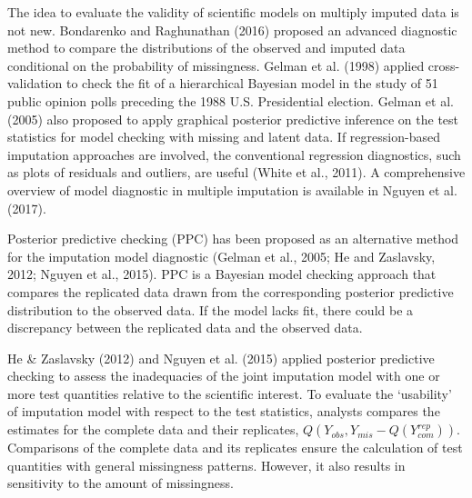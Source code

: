 \documentclass[12pt, fullpage, a4paper]{article}
\begin{document}
The idea to evaluate the validity of scientific models on multiply imputed data is not new. Bondarenko and Raghunathan (2016)\nocite{bondarenko2016graphical} proposed an advanced diagnostic method to compare the distributions of the observed and imputed data conditional on the probability of missingness. Gelman et al. (1998)\nocite{gelman1998not} applied cross-validation to check the fit of a hierarchical Bayesian model in the study of 51 public opinion polls preceding the 1988 U.S. Presidential election. Gelman et al. (2005) also proposed to apply graphical posterior predictive inference on the test statistics for model checking with missing and latent data. If regression-based imputation approaches are involved, the conventional regression diagnostics, such as plots of residuals and outliers, are useful (White et al., 2011)\nocite{white2011multiple}. A comprehensive overview of model diagnostic in multiple imputation is available in Nguyen et al. (2017)\nocite{nguyen2017model}.

Posterior predictive checking (PPC) has been proposed as an alternative method for the imputation model diagnostic (Gelman et al., 2005; He and Zaslavsky, 2012; Nguyen et al., 2015\nocite{nguyen2015posterior}). PPC is a Bayesian model checking approach that compares the replicated data drawn from the corresponding posterior predictive distribution to the observed data. If the model lacks fit, there could be a discrepancy between the replicated data and the observed data. 

He \& Zaslavsky (2012) and Nguyen et al. (2015) applied posterior predictive checking to assess the inadequacies of the joint imputation model with one or more test quantities relative to the scientific interest. To evaluate the `usability' of imputation model with respect to the test statistics, analysts compares the estimates for the complete data and their replicates, $Q(Y_{obs}, Y_{mis} - Q(Y^{rep}_{com}))$. Comparisons of the complete data and its replicates ensure the calculation of test quantities with general missingness patterns. However, it also results in sensitivity to the amount of missingness.    
\end{document}
